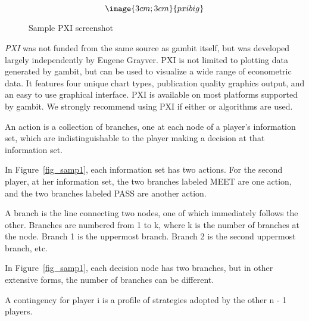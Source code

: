 {\begin{figure}
$$\image{3cm;3cm}{pxibig}$$
\caption{Sample PXI screenshot}\label{fig_pxibig}
\end{figure}

{\em PXI} was not funded from the same source as gambit itself, but was 
developed largely independently by Eugene Grayver.  PXI is not limited to
plotting data generated by gambit, but can be used to visualize a wide range
of econometric data.  It features four unique chart types, publication quality
graphics output, and an easy to use graphical interface.  PXI is available on
most platforms supported by gambit.  We strongly recommend using PXI if
either  or  algorithms are used.





%
\setfooter{\thepage}{}{}{}{}{\thepage}%

\begin{helpglossary}
%
\setfooter{\thepage}{}{}{}{}{\thepage}%

\label{actiongloss}
An action is a collection of branches, one at each node of a player's information 
set, which are indistinguishable to the player making a decision at that 
information set. 

In Figure~\ref{fig_samp1}, each information set has two actions.  For the 
second player, at her information set, the two branches labeled MEET are one 
action, and the two branches labeled PASS are another action.
 
\label{branchgloss}
A branch is the line connecting two nodes, one of which immediately 
follows the other.  Branches are numbered from 1 to k, where k is the 
number of branches at the node.  Branch 1 is the uppermost branch.  Branch 
2 is the second uppermost branch, etc. 

In Figure~\ref{fig_samp1}, each decision node has two branches, but in
other extensive forms, the number of branches can be different.

\label{continggloss}
A contingency for player i is a profile of strategies adopted by the other
 n - 1 players.


\end{helpglossary}}
